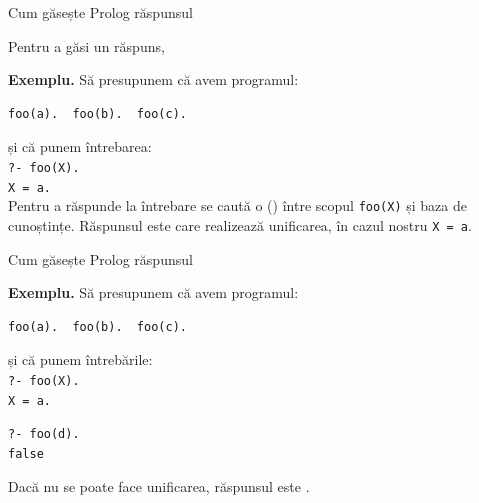\documentclass[xcolor=pdftex,romanian,colorlinks]{beamer}
\begin{document}
\begin{frame}[fragile]{Cum găsește Prolog răspunsul}

Pentru a găsi un răspuns, \\ 

\textbf{\color{True} Exemplu.}
Să presupunem că avem programul: 
\begin{verbatim}
foo(a).  foo(b).  foo(c).
\end{verbatim}
și că punem întrebarea: \\
{\color{blue}\texttt{?- foo(X).}}\\
{\color{blue}\texttt{X = a.}}\\


Pentru a răspunde la întrebare se caută o  () între scopul {\color{blue}\texttt{foo(X)}} și baza de cunoștințe. Răspunsul este  care realizează unificarea, în cazul nostru {\color{blue}\texttt{X = a}}. 

\begin{center}
\end{center}

\end{frame}



\begin{frame}[fragile]{Cum găsește Prolog răspunsul}

\textbf{\color{True} Exemplu.} Să presupunem că avem programul: 
\begin{verbatim}
foo(a).  foo(b).  foo(c).
\end{verbatim}
și că punem  întrebările: \\
{\color{blue}\texttt{?- foo(X).}}\\
{\color{blue}\texttt{X = a.}}\\
\medskip

{\color{blue}\texttt{?- foo(d).}}\\
{\color{red}\texttt{false}}\\
\smallskip


Dacă nu se poate face unificarea, răspunsul este 
{\color{red}{false}}.

\end{frame}
\end{document}
